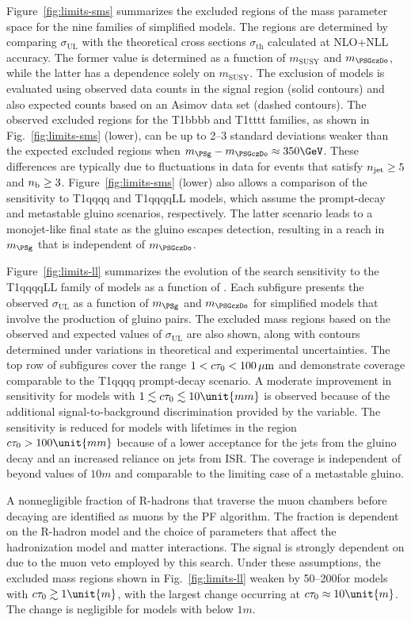 Figure~\ref{fig:limits-sms} summarizes the excluded regions of the
mass parameter space for the nine families of simplified models. The
regions are determined by comparing $\sigma_\text{UL}$ with the
theoretical cross sections $\sigma_\text{th}$ calculated at NLO+NLL
accuracy.  The former value is determined as a function of
$m_{\text{SUSY}}$ and $m_{\PSGczDo}$, while the latter has a
dependence solely on $m_{\text{SUSY}}$. The exclusion of models is
evaluated using observed data counts in the signal region (solid
contours) and also expected counts based on an Asimov data set (dashed
contours). The observed excluded regions for the T1bbbb and T1tttt
families, as shown in Fig.~\ref{fig:limits-sms} (lower), can be up to
2--3 standard deviations weaker than the expected excluded regions
when $m_{\PSg} - m_{\PSGczDo} \approx 350\GeV$. These differences are
typically due to fluctuations in data for events that satisfy $n_{\text{jet}}
\geq 5$ and $n_{\mathrm{b}} \geq 3$. Figure~\ref{fig:limits-sms} (lower) also
allows a comparison of the sensitivity to T1qqqq and T1qqqqLL models,
which assume the prompt-decay and metastable gluino scenarios,
respectively. The latter scenario leads to a monojet-like final state
as the gluino escapes detection, resulting in a reach in $m_\PSg$ that
is independent of $m_{\PSGczDo}$.

Figure~\ref{fig:limits-ll} summarizes the evolution of the search
sensitivity to the T1qqqqLL family of models as a function of
\ctau. Each subfigure presents the observed $\sigma_\text{UL}$ as a
function of $m_{\PSg}$ and $m_{\PSGczDo}$ for simplified models that
involve the production of gluino pairs. The excluded mass regions
based on the observed and expected values of $\sigma_\text{UL}$ are
also shown, along with contours determined under variations in
theoretical and experimental uncertainties. The top row of subfigures
cover the range $1 < c\tau_{0} < 100\,{\mu}\mathrm{m}$ and demonstrate coverage
comparable to the T1qqqq prompt-decay scenario. A moderate improvement
in sensitivity for models with $1 \lesssim \ctau \lesssim 10\unit{mm}$
is observed because of the additional signal-to-background
discrimination provided by the \nb variable. The sensitivity is
reduced for models with lifetimes in the region $\ctau > 100\unit{mm}$
because of a lower acceptance for the jets from the gluino decay and
an increased reliance on jets from ISR. The coverage is independent of
\ctau beyond values of $10\unit{m}$ and comparable to the limiting
case of a metastable gluino.

A nonnegligible fraction of R-hadrons that traverse the muon chambers
before decaying are identified as muons by the PF algorithm. The
fraction is dependent on the R-hadron model and the choice of
parameters that affect the hadronization model and matter
interactions. The signal \ate is strongly dependent on \ctau due to
the muon veto employed by this search. Under these assumptions, the
excluded mass regions shown in Fig.~\ref{fig:limits-ll} weaken by
50--200\GeV for models with $\ctau \gtrsim 1\unit{m}$, with the
largest change occurring at $\ctau \approx 10\unit{m}$. The change is
negligible for models with \ctau below $1\unit{m}$.

